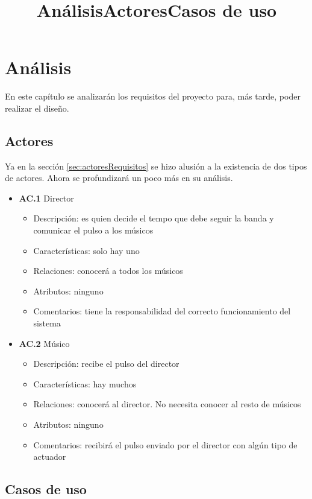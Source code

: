 \chapter{Análisis}
\title{Análisis}
\label{cap:Analisis}


En este capítulo se analizarán los requisitos del proyecto para, más tarde, poder
realizar el diseño.\\


\title{Actores}
\section{Actores}

Ya en la sección \ref{sec:actoresRequisitos} se hizo alusión a la existencia de
dos tipos de actores. Ahora se profundizará un poco más en su análisis.\\


\begin{itemize}
  \item \textbf{AC.1} Director
  \begin{itemize}
   \item Descripción: es quien decide el tempo que debe seguir la banda y comunicar el pulso
   a los músicos
   \item Características: solo hay uno
   \item Relaciones: conocerá a todos los músicos
   \item Atributos: ninguno
   \item Comentarios: tiene la responsabilidad del correcto funcionamiento del sistema
  \end{itemize}

  \item \textbf{AC.2} Músico
  \begin{itemize}
     \item Descripción: recibe el pulso del director
     \item Características: hay muchos
     \item Relaciones: conocerá al director. No necesita conocer al resto de músicos
     \item Atributos: ninguno
     \item Comentarios: recibirá el pulso enviado por el director con algún tipo de actuador
  \end{itemize}
\end{itemize}

\title{Casos de uso}
\section{Casos de uso}


